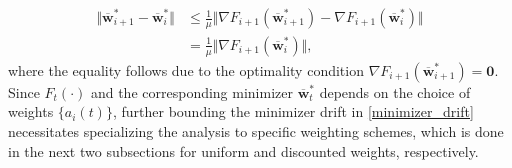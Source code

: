 \documentclass[conference]{IEEEtran}
\begin{document}
\begin{align}
    \Vert  \overline{\mathbf{w}}^*_{i+1} - \overline{\mathbf{w}}^*_{i} \Vert &\leq \frac{1}{\mu} \Vert \nabla F_{i+1}( \overline{\mathbf{w}}^*_{i+1}) -\nabla F_{i+1}( \overline{\mathbf{w}}^*_{i})\Vert \nonumber\\ 
    &= \frac{1}{\mu} \Vert \nabla F_{i+1}( \overline{\mathbf{w}}^*_{i})\Vert, \label{minimizer_drift}
\end{align}
where the equality follows due to the optimality condition $ \nabla F_{i+1}( \overline{\mathbf{w}}^*_{i+1}) = \mathbf{0}$. Since $F_t(\cdot)$ and the corresponding minimizer $\overline{\mathbf{w}}^*_{t}$  depends on the choice of weights $\{a_i(t)\}$, further bounding the minimizer drift in \eqref{minimizer_drift} necessitates specializing the analysis to specific weighting schemes, which is done in the next two subsections for uniform and discounted weights, respectively.

\end{document}
